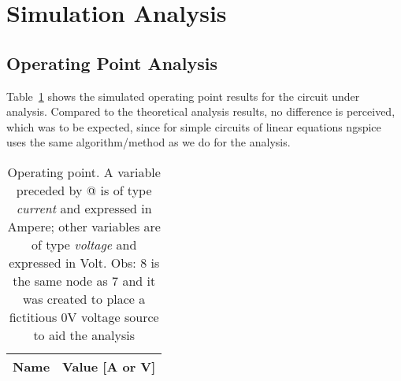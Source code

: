\section{Simulation Analysis}
\label{sec:simulation}

\subsection{Operating Point Analysis}

Table~\ref{tab:op} shows the simulated operating point results for the circuit
under analysis. Compared to the theoretical analysis results, no difference is perceived, which was to be expected, since for simple circuits of linear equations ngspice uses the same algorithm/method as we do for the analysis.

\begin{table}[h]
  \centering
  \begin{tabular}{|l|r|}
    \hline    
    {\bf Name} & {\bf Value [A or V]} \\ \hline
    
  \end{tabular}
  \caption{Operating point. A variable preceded by @ is of type {\em current}
    and expressed in Ampere; other variables are of type {\it voltage} and expressed in Volt. Obs: 8 is the same node as 7 and it was created to place a fictitious 0V voltage source to aid the analysis}
  \label{tab:op}
\end{table}
